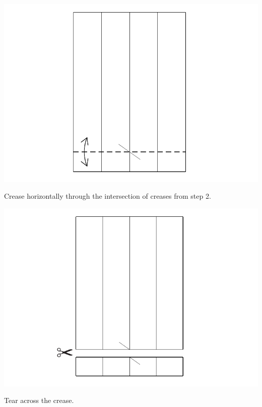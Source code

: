 \documentclass[11pt]{article}
\begin{document}
\begin{minipage}[t]{0.3\textwidth}
  \includegraphics[width=\textwidth]{../figs/fig03-04}
  \begin{itemize}{\item[4.] Crease horizontally through the intersection of creases from step 2.}\end{itemize}
\end{minipage}
\begin{minipage}[t]{0.3\textwidth}
  \includegraphics[width=\textwidth]{../figs/fig03-05}
  \begin{itemize}{\item[5.] Tear across the crease.}\end{itemize}
\end{minipage}
\end{document}
